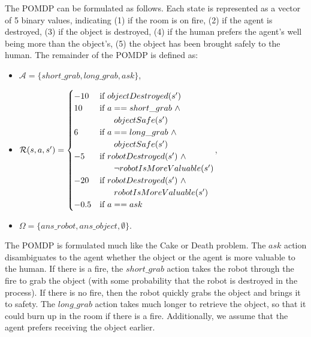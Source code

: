 \documentclass[11pt]{article}
\begin{document}
The POMDP can be formulated as follows. Each state is represented as a vector of 5 binary values, indicating (1) if the room is on fire, (2) if the agent is destroyed, (3) if the object is destroyed, (4) if the human prefers the agent's well being more than the object's, (5) the object has been brought safely to the human.
The remainder of the POMDP is defined as:
\begin{itemize}
\item[] $\mathcal{A} = \{short\_grab, long\_grab, ask \}$,
\item[] $\mathcal{R}(s, a,s') =
 \begin{cases} 
-10 & \mbox{if } objectDestroyed(s') \\
10 & \mbox{if } a == short\_grab\ \wedge\ \\ & \hspace{6mm} objectSafe(s') \\
6 & \mbox{if } a == long\_grab\ \wedge\ \\ & \hspace{6mm} objectSafe(s') \\
-5 & \mbox{if } robotDestroyed(s')\ \wedge \\ & \hspace{6mm} \neg robotIsMoreValuable(s') \\
-20 & \mbox{if } robotDestroyed(s')\ \wedge \\ & \hspace{6mm} robotIsMoreValuable(s') \\
-0.5 & \mbox{if } a == ask
\end{cases}$,
\item[] $\Omega = \{ans\_robot, ans\_object, \emptyset \}$.
\end{itemize}

The POMDP is formulated much like the Cake or Death problem. The $ask$ action disambiguates to the agent whether the object or the agent is more valuable to the human. If there is a fire, the $short\_grab$ action takes the robot through the fire to grab the object (with some probability that the robot is destroyed in the process). If there is no fire, then the robot quickly grabs the object and brings it to safety. The $long\_grab$ action takes much longer to retrieve the object, so that it could burn up in the room if there is a fire. Additionally, we assume that the agent prefers receiving the object earlier.
\end{document}
